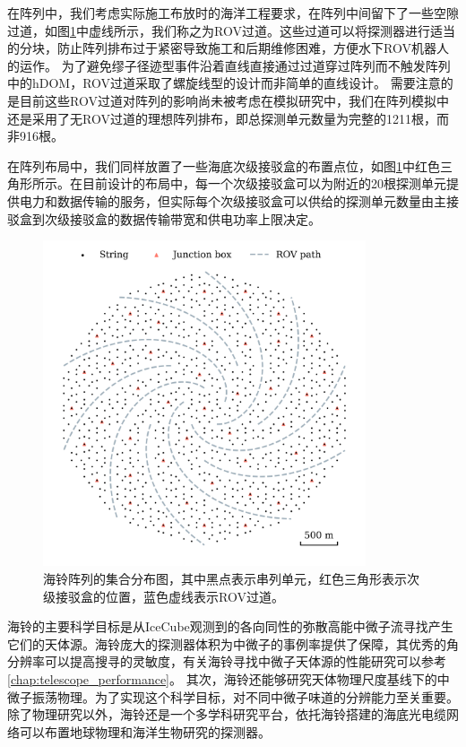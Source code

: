 在阵列中，我们考虑实际施工布放时的海洋工程要求，在阵列中间留下了一些空隙过道，如图\ref{fig:geo-layout}中虚线所示，我们称之为ROV过道。这些过道可以将探测器进行适当的分块，防止阵列排布过于紧密导致施工和后期维修困难，方便水下ROV机器人的运作。
为了避免缪子径迹型事件沿着直线直接通过过道穿过阵列而不触发阵列中的hDOM，ROV过道采取了螺旋线型的设计而非简单的直线设计。
需要注意的是目前这些ROV过道对阵列的影响尚未被考虑在模拟研究中，我们在阵列模拟中还是采用了无ROV过道的理想阵列排布，即总探测单元数量为完整的1211根，而非916根。

在阵列布局中，我们同样放置了一些海底次级接驳盒的布置点位，如图\ref{fig:geo-layout}中红色三角形所示。在目前设计的布局中，每一个次级接驳盒可以为附近的20根探测单元提供电力和数据传输的服务，但实际每个次级接驳盒可以供给的探测单元数量由主接驳盒到次级接驳盒的数据传输带宽和供电功率上限决定。

\begin{figure}[!htb]%
    \centering
    \includegraphics[width=0.85\textwidth]{img/penrose_tiling.png}
    \caption{海铃阵列的集合分布图，其中黑点表示串列单元，红色三角形表示次级接驳盒的位置，蓝色虚线表示ROV过道。}
    \label{fig:geo-layout}
\end{figure}

海铃的主要科学目标是从IceCube观测到的各向同性的弥散高能中微子流寻找产生它们的天体源。海铃庞大的探测器体积为中微子的事例率提供了保障，其优秀的角分辨率可以提高搜寻的灵敏度，有关海铃寻找中微子天体源的性能研究可以参考\ref{chap:telescope_performance}。
其次，海铃还能够研究天体物理尺度基线下的中微子振荡物理。为了实现这个科学目标，对不同中微子味道的分辨能力至关重要。
除了物理研究以外，海铃还是一个多学科研究平台，依托海铃搭建的海底光电缆网络可以布置地球物理和海洋生物研究的探测器。

